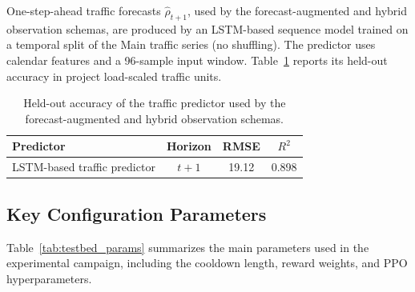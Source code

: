 \documentclass[a4paper,fleqn]{cas-sc}
\begin{document}
One-step-ahead traffic forecasts $\hat{\rho}_{t+1}$, used by the forecast-augmented and hybrid observation schemas, are produced by an LSTM-based sequence model trained on a temporal split of the Main traffic series (no shuffling). The predictor uses calendar features and a 96-sample input window. Table~\ref{tab:forecast_acc} reports its held-out accuracy in project load-scaled traffic units.

\begin{table}[width=.9\linewidth,cols=4,pos=h]
\centering
\caption{Held-out accuracy of the traffic predictor used by the forecast-augmented and hybrid observation schemas.}
\label{tab:forecast_acc}
\begin{tabular}{l c c c}
\hline
Predictor & Horizon & RMSE & $R^2$ \\
\hline
LSTM-based traffic predictor  & \(t{+}1\) & 19.12 & 0.898 \\
\hline
\end{tabular}
\end{table}

\subsection{Key Configuration Parameters}

\label{subsec:key_params}

Table~\ref{tab:testbed_params} summarizes the main parameters used in the experimental campaign, including the cooldown length, reward weights, and PPO hyperparameters.
\end{document}
